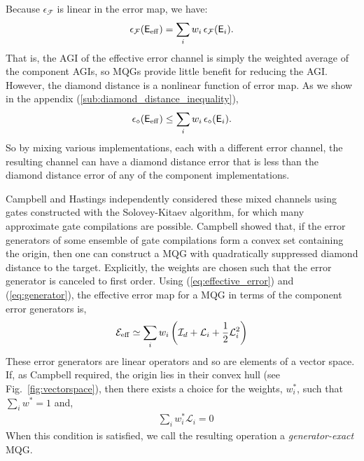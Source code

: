 \documentclass[aps,nofootinbib,pra,notitlepage,twocolumn]{revtex4-1}
\newcommand{\error}{\ensuremath{{\mathsf{E}}}}
\newcommand{\errmat}{\ensuremath{{\mathcal{E}}}}
\newcommand{\genmat}{\ensuremath{{\mathcal{L}}}}
\newcommand{\AGI}{\ensuremath{\epsilon_\mathcal{F}}}
\newcommand{\dnorm}{\ensuremath{\epsilon_\diamond}}
\newcommand{\identmat}{\ensuremath{\mathcal{I}}}
\newcommand{\0}{\ensuremath{\mathbf{0}}}
\newcommand{\weight}{\ensuremath{w}}
\begin{document}
Because $\AGI$ is linear in the error map, we have:
\begin{equation}
	\AGI\!\left(\error_{\rm eff}\right) = \sum_i \weight_i \,\AGI(\error_i).
\end{equation}
That is, the AGI of the effective error channel is simply the weighted average of the component AGIs, so MQGs provide little benefit for reducing the AGI. However, the diamond distance is a nonlinear function of error map. As we show in the appendix (\ref{sub:diamond_distance_inequality}),
\begin{equation}
	\label{eq:diamond_ineq}
	\dnorm\!\left(\error_{\rm eff}\right) \le \sum_i \weight_i \, \dnorm(\error_i).
\end{equation}
So by mixing various implementations, each with a different error channel, the resulting channel can have a diamond distance error that is less than the diamond distance error of any of the component implementations. 

Campbell \cite{Campbell2017} and Hastings \cite{1612.01011} independently considered these mixed channels using gates constructed with the Solovey-Kitaev algorithm, for which many approximate gate compilations are possible. Campbell showed that, if the error generators of some ensemble of gate compilations form a convex set containing the origin, then one can construct a MQG with quadratically suppressed diamond distance to the target. Explicitly, the weights are chosen such that the error generator is canceled to first order. Using (\ref{eq:effective_error}) and (\ref{eq:generator}), the effective error map for a MQG in terms of the component error generators is,
\begin{align}
	\label{eq:generators_and_effective_error}
	\errmat_{\rm eff} \simeq \sum_i \weight_i \left(\identmat_d + \genmat_i + \frac{1}{2}  \genmat_i^2\right)
\end{align}
These error generators are linear operators and so are elements of a vector space. If, as Campbell required, the origin lies in their convex hull (see Fig.~\ref{fig:vectorspace}), then there exists a choice for the weights, $\weight_i^*$, such that $\sum_i \weight^*=1$ and,
\begin{align}
	\label{eq:cancel}
	&\sum_i \weight_i^* \genmat_i= 0
\end{align}
When this condition is satisfied, we call the resulting operation a \emph{generator-exact} MQG. 
\end{document}
